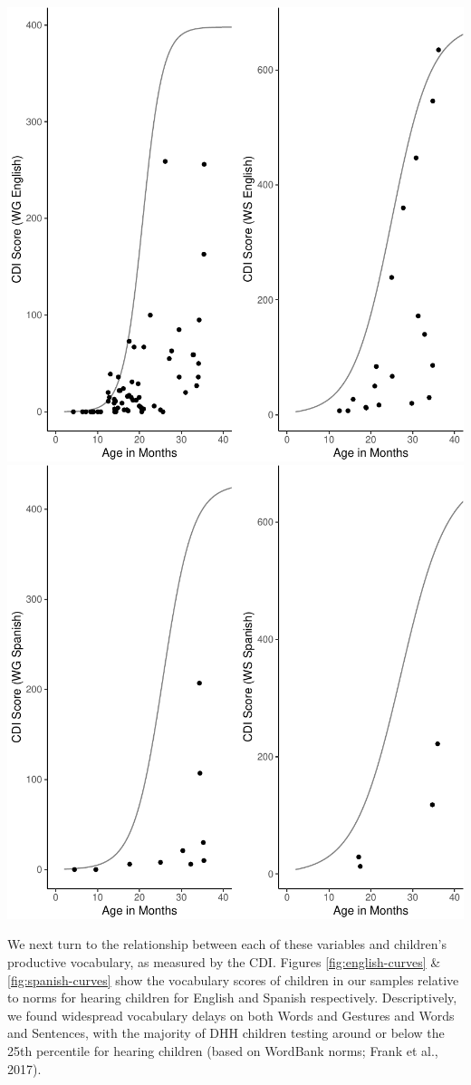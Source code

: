\documentclass[english,man]{apa6}
\begin{document}
\includegraphics{ELSSP_paper_files/figure-latex/spanish-curves-1.pdf} \includegraphics{ELSSP_paper_files/figure-latex/spanish-curves-2.pdf}

We next turn to the relationship between each of these variables and children's productive vocabulary, as measured by the CDI. Figures \ref{fig:english-curves} \& \ref{fig:spanish-curves} show the vocabulary scores of children in our samples relative to norms for hearing children for English and Spanish respectively. Descriptively, we found widespread vocabulary delays on both Words and Gestures and Words and Sentences, with the majority of DHH children testing around or below the 25th percentile for hearing children (based on WordBank norms; Frank et al., 2017).
\end{document}
